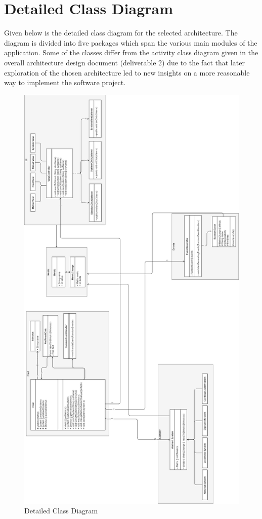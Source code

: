 \documentclass[]{article}
\begin{document}
\section{Detailed Class Diagram}
\label{sec:detailed_class_diagram}
Given below is the detailed class diagram for the selected architecture. The diagram is divided into five packages which span the various main modules of the application.
Some of the classes differ from the activity class diagram given in the overall architecture design document (deliverable 2) due to the fact that later exploration of the chosen
architecture led to new insights on a more reasonable way to implement the software project.

\begin{figure}[H]
	\centering
	\includegraphics[scale = 0.24]{../Resources/ClassDiagram.png}
	\caption{Detailed Class Diagram}
\end{figure}
\end{document}
